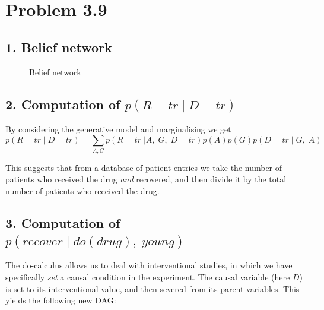 \documentclass[11pt,a4paper,oneside]{report}
\begin{document}
\section*{Problem 3.9}

\subsection*{1. Belief network}

\begin{figure}[H]
  \centering
    \caption{Belief network}
    \label{fig:all_trade_cca_black}     
\end{figure}

\subsection*{2. Computation of $p(R=tr \; | \; D=tr)$}

By considering the generative model and marginalising we get 
\begin{equation}
p(R=tr \; | \; D=tr) = \sum\limits_{A,G} p(R=tr \;
| A, \; G,\; D=tr) p(A) p(G) p(D=tr \; | \; G, \; A)
\end{equation}

This suggests that from a database of patient entries we 
take the number of patients who received the drug \emph{and} recovered, and
then divide it by the total number of patients who received the drug. 

\subsection*{3. Computation of $p(recover \; | \; do(drug),\; young)$}

The do-calculus allows us to deal with interventional studies, in which we
have specifically \emph{set} a causal condition in the experiment. The causal
variable (here $D$) is set to its interventional value, and then severed from
its parent variables. This yields the following new DAG:
\end{document}
